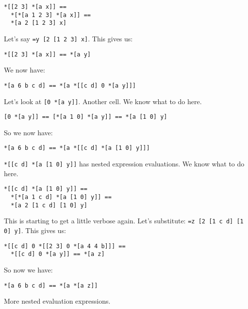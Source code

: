 \documentclass[twoside]{article}
\begin{document}
\begin{lstlisting}[style=listingblock]
*[[2 3] *[a x]] ==
  *[*[a 1 2 3] *[a x]] ==
  *[a 2 [1 2 3] x]
\end{lstlisting}

Let's say \lstinline[style=inlinecode]{=y [2 [1 2 3] x]}. This gives us:

\begin{lstlisting}[style=listingblock]
*[[2 3] *[a x]] == *[a y]
\end{lstlisting}

We now have:

\begin{lstlisting}[style=listingcode]
*[a 6 b c d] == *[a *[[c d] 0 *[a y]]]
\end{lstlisting}

Let's look at \lstinline[style=inlinecode]{[0 *[a y]]}. Another cell. We know what to do here.

\begin{lstlisting}[style=listingblock]
[0 *[a y]] == [*[a 1 0] *[a y]] == *[a [1 0] y]
\end{lstlisting}

So we now have:

\begin{lstlisting}[style=listingblock]
*[a 6 b c d] == *[a *[[c d] *[a [1 0] y]]]
\end{lstlisting}

\lstinline[style=inlinecode]{*[[c d] *[a [1 0] y]]} has nested expression evaluations. We know what to do here.

\begin{lstlisting}[style=listingblock]
*[[c d] *[a [1 0] y]] ==
  *[*[a 1 c d] *[a [1 0] y]] ==
  *[a 2 [1 c d] [1 0] y]
\end{lstlisting}

This is starting to get a little verbose again. Let's substitute:
\lstinline[style=inlinecode]{=z [2 [1 c d] [1 0] y]}. This gives us:

\begin{lstlisting}[style=listingblock]
*[[c d] 0 *[[2 3] 0 *[a 4 4 b]]] ==
  *[[c d] 0 *[a y]] == *[a z]
\end{lstlisting}

So now we have:

\begin{lstlisting}[style=listingblock]
*[a 6 b c d] == *[a *[a z]]
\end{lstlisting}

More nested evaluation expressions.
\end{document}
